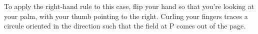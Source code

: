 To apply the right-hand rule to this case, flip your hand so
that you're looking at your palm, with your thumb pointing to
the right. Curling your fingers traces a circule oriented in
the direction such that the field at P comes out of the page.
